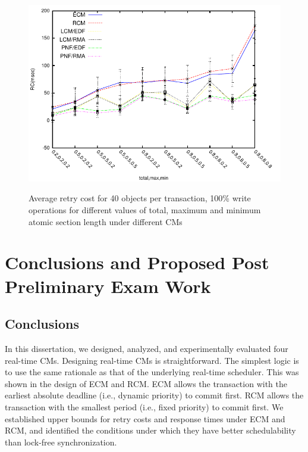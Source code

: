 \documentclass[12pt,english]{report}
\begin{document}
\begin{figure}
{\includegraphics[scale=0.7]
{figures/Abr_dur_20t_420obj_100wr}
\label{fig:20t_ecm_rcm_lcm_pnf_420obj_100wr}
}
\caption{Average retry cost for 40 objects per transaction, 100\% write operations for different values of total, maximum and minimum atomic section length under different CMs}
\label{fig:cm_40obj_per_tx_100wr}
\end{figure}

\chapter{\label{conclusions}Conclusions and Proposed Post Preliminary Exam Work}

\section{Conclusions}

In this dissertation, we designed, analyzed, and experimentally evaluated four real-time CMs. Designing real-time CMs is straightforward. The simplest logic is to use the same rationale as that of the underlying real-time scheduler. This was shown in the design of ECM and RCM. ECM allows the transaction with the earliest absolute deadline (i.e., dynamic priority) to commit first. RCM allows the transaction with the smallest period (i.e., fixed priority) to commit first. We established upper bounds for retry costs and response times under ECM and RCM, and identified the conditions under which they have better schedulability than lock-free synchronization. 
\end{document}
